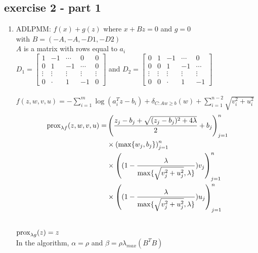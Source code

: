 
\subsection{exercise 2 - part 1}
\begin{enumerate}
    \item ADLPMM: $f(x) + g(z)$ where $x + Bz = 0$ and $g=0$\\
    with $B = (-A, -A, -D1, -D2)$\\
    $A$ is a matrix with rows equal to $a_i$\\
    $D_1=
    \begin{bmatrix}
        1 & -1 & \cdots & 0 & 0\\
        0 & 1 & -1 & \cdots & 0\\
        \vdots & \vdots & \vdots & \vdots & \vdots\\
        0 & \cdot & 1 & -1 & 0
    \end{bmatrix}
    $ and 
    $D_2=
    \begin{bmatrix}
        0 & 1 & -1 & \cdots & 0 \\
        0 & 0 & 1 & -1 & \cdots \\
        \vdots & \vdots & \vdots & \vdots & \vdots\\
        0 & 0 & \cdot & 1 & -1
    \end{bmatrix}
    $\\\\
    $f(z, w, v, u) = -\sum_{i=1}^m{\log(a_i^T z - b_i)} + \delta_{C:A w \geq b}(w) + \sum_{i=1}^{n-2} \sqrt{v_i^2 + u_i^2}$ \\
    \begin{align*}
        \operatorname{prox}_{\lambda f}(z,w,v,u) = &\left(\frac{z_j-b_j + \sqrt{(z_j-b_j)^2 + 4\lambda}}{2} + b_j\right)^n_{j=1}\\
        & \times \left(\max\{w_j,b_j\}\right)^n_{j=1}\\
        & \times \left((1-\frac{\lambda}{\max\{\sqrt{v_j^2+u_j^2}, \lambda\}})v_j\right)_{j=1}^n\\
        & \times \left((1-\frac{\lambda}{\max\{\sqrt{v_j^2+u_j^2}, \lambda\}})u_j\right)_{j=1}^n
    \end{align*}\\

    $\operatorname{prox}_{\lambda g}(z) = z$\\
    In the algorithm, $\alpha = \rho $ and $\beta = \rho \lambda_{max}(B^T B)$


\end{enumerate}
